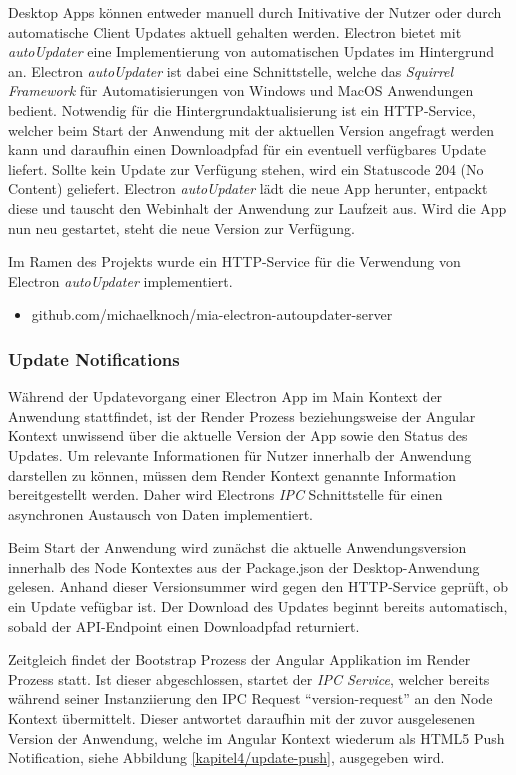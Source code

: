 Desktop Apps können entweder manuell durch Initivative der Nutzer oder durch
automatische Client Updates aktuell gehalten werden.
Electron bietet mit \emph{autoUpdater} eine Implementierung
von automatischen Updates im Hintergrund an.
Electron \emph{autoUpdater} ist dabei eine Schnittstelle, welche das \emph{Squirrel Framework}
für Automatisierungen von Windows und MacOS Anwendungen bedient.
Notwendig für die Hintergrundaktualisierung ist ein HTTP-Service, welcher beim Start der Anwendung mit der
aktuellen Version angefragt werden kann
und daraufhin einen Downloadpfad für ein eventuell verfügbares Update liefert.
Sollte kein Update zur Verfügung stehen, wird ein Statuscode 204 (No Content) geliefert.
Electron \emph{autoUpdater} lädt die neue App herunter, entpackt diese und tauscht den Webinhalt der Anwendung zur Laufzeit aus.
Wird die App nun neu gestartet, steht die neue Version zur Verfügung.

Im Ramen des Projekts \projectname{} wurde ein HTTP-Service für die
Verwendung von Electron \emph{autoUpdater} implementiert.
\begin{itemize}
\item github.com/michaelknoch/mia-electron-autoupdater-server
\end{itemize}

\subsubsection{Update Notifications}

Während der Updatevorgang einer Electron App im Main Kontext der
Anwendung stattfindet, ist der Render Prozess beziehungsweise der Angular Kontext unwissend über die aktuelle
Version der App sowie den Status des Updates. Um relevante Informationen für Nutzer innerhalb der Anwendung darstellen zu können,
müssen dem Render Kontext genannte Information bereitgestellt werden.
Daher wird Electrons \emph{IPC} Schnittstelle für einen asynchronen Austausch von Daten implementiert.

Beim Start der Anwendung wird zunächst die aktuelle Anwendungsversion innerhalb des Node Kontextes aus der Package.json der Desktop-Anwendung gelesen.
Anhand dieser Versionsummer wird gegen den HTTP-Service geprüft, ob ein Update vefügbar ist. Der Download des Updates beginnt bereits automatisch,
sobald der API-Endpoint einen Downloadpfad returniert.

Zeitgleich findet der Bootstrap Prozess der Angular Applikation im Render Prozess statt.
Ist dieser abgeschlossen, startet der \emph{IPC Service}, welcher bereits während seiner Instanziierung den
IPC Request ``version-request'' an den Node Kontext übermittelt.
Dieser antwortet daraufhin mit der zuvor ausgelesenen Version der Anwendung, welche im Angular Kontext wiederum als HTML5 Push Notification, siehe Abbildung \ref{kapitel4/update-push}, ausgegeben wird.


